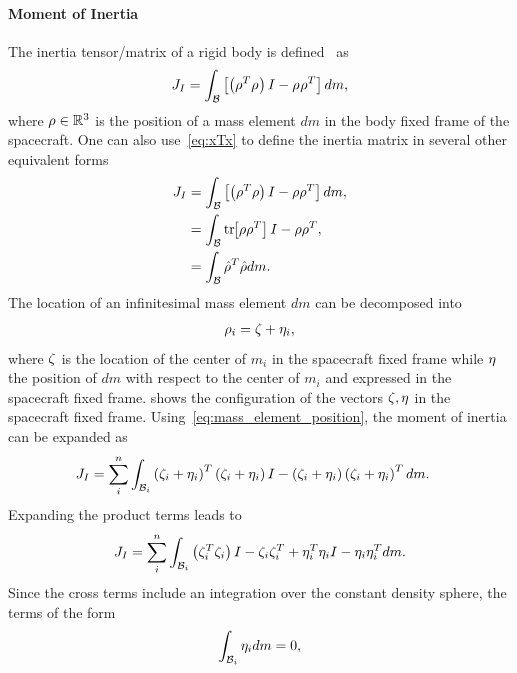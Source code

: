 \paragraph{Moment of Inertia}\label{sec:moment_of_inertia}
The inertia tensor/matrix of a rigid body is defined~\cite{greenwood1988} as
\begin{align}\label{eq:moi_definition}
    J_I = \int_{\mathcal{B}} \left[  \left( \rho_{}^T \rho_{}  \right)I - \rho_{}\rho_{}^T \right] dm, 
\end{align}
where \( \rho \in \mathbb{R}^3 \) is the position of a mass element \( dm \) in the body fixed frame of the spacecraft.
One can also use~\cref{eq:xTx} to define the inertia matrix in several other equivalent forms
\begin{align*}
    J_I &= \int_{\mathcal{B}} \left[  \left( \rho^T \rho  \right)I - \rho\rho^T \right] dm, \\
        &= \int_{\mathcal{B}} \mathrm{tr}\negthickspace\left[ \rho\rho^T \right] I - \rho\rho^T, \\
        &= \int_{\mathcal{B}} \hat{\rho}^T \hat{\rho} dm.
\end{align*}
The location of an infinitesimal mass element \( dm \) can be decomposed into
\begin{align}\label{eq:mass_element_position}
    \rho_i = \zeta + \eta_i, 
\end{align}
where \( \zeta \) is the location of the center of \( m_i \) in the spacecraft fixed frame while \( \eta \) the position of \( dm \) with respect to the center of \( m_i \) and expressed in the spacecraft fixed frame.
 shows the configuration of the vectors \( \zeta, \eta \) in the spacecraft fixed frame.
Using~\cref{eq:mass_element_position}, the moment of inertia can be expanded as
\begin{align*}
    J_I &= \sum_i^n \int_{\mathcal{B}_i} \left( \zeta_i + \eta_i \right)^T \left( \zeta_i + \eta_i  \right) I  - \left( \zeta_i + \eta_i \right) \left( \zeta_i + \eta_i \right)^T dm .
\end{align*}
Expanding the product terms leads to
\begin{align*}
    J_I = \sum_i^n \int_{\mathcal{B}_i} \left( \zeta_i^T \zeta_i \right)I - \zeta_i \zeta_i^T + \eta_i^T \eta_i I - \eta_i \eta_i^T dm.
\end{align*}
Since the cross terms include an integration over the constant density sphere, the terms of the form
\begin{align*}
    \int_{\mathcal{B}_i} \eta_i dm = 0,
\end{align*}
